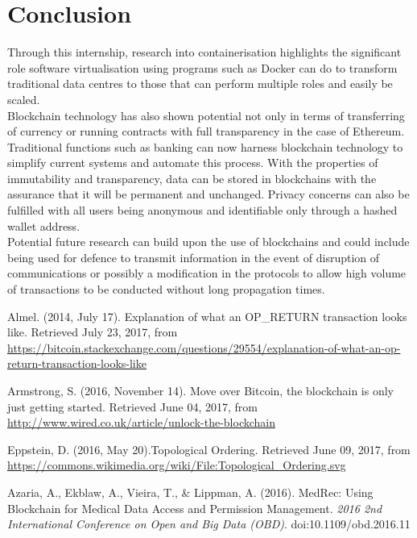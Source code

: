 \documentclass[a4paper,12pt]{article}
\begin{document}
{{	\newpage
	\section{Conclusion}
	Through this internship, research into containerisation highlights the significant role software virtualisation using programs such as Docker can do to transform traditional data centres to those that can perform multiple roles and easily be scaled.\\\newline
	Blockchain technology has also shown potential not only in terms of transferring of currency or running contracts with full transparency in the case of Ethereum. Traditional functions such as banking can now harness blockchain technology to simplify current systems and automate this process. With the properties of immutability and transparency, data can be stored in blockchains with the assurance that it will be permanent and unchanged. Privacy concerns can also be fulfilled with all users being anonymous and identifiable only through a hashed wallet address.\\\newline
	Potential future research can build upon the use of blockchains and could include being used for defence to transmit information in the event of disruption of communications or possibly a modification in the protocols to allow high volume of transactions to be conducted without long propagation times.
	\newpage
	\begin{thebibliography}{9}

Almel. (2014, July 17). Explanation of what an OP\_RETURN transaction looks like. Retrieved July 23, 2017, from \href{https://bitcoin.stackexchange.com/questions/29554/explanation-of-what-an-op-return-transaction-looks-like}{https://bitcoin.stackexchange.com/questions/29554/explanation-of-what-an-op-return-transaction-looks-like}
		
Armstrong, S. (2016, November 14). Move over Bitcoin, the blockchain is only just getting started. Retrieved June 04, 2017, from \href{http://www.wired.co.uk/article/unlock-the-blockchain}{http://www.wired.co.uk/article/unlock-the-blockchain}

Eppstein, D. (2016, May 20).Topological Ordering. Retrieved June 09, 2017, from \href{https://commons.wikimedia.org/wiki/File:Topological_Ordering.svg}{https://commons.wikimedia.org/wiki/File:Topological\_Ordering.svg}

Azaria, A., Ekblaw, A., Vieira, T., \& Lippman, A. (2016). MedRec: Using Blockchain for Medical Data Access and Permission Management. \textit{2016 2nd International Conference on Open and Big Data (OBD)}. doi:10.1109/obd.2016.11


\end{thebibliography}}}
\end{document}

